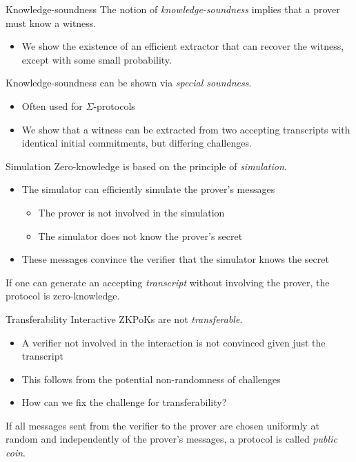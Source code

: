 \begin{frame}{Knowledge-soundness}
  The notion of \emph{knowledge-soundness} implies that a prover must know a witness.
  \begin{itemize}[<+(1)->]
    \item We show the existence of an efficient extractor that can recover the witness, except with some small probability.
  \end{itemize}

  \vspace*{1em}

  \pause
  Knowledge-soundness can be shown via \emph{special soundness}.
  \begin{itemize}[<+(1)->]
    \item Often used for $\Sigma$-protocols
    \item We show that a witness can be extracted from two accepting transcripts with identical initial commitments, but differing challenges.
  \end{itemize}
\end{frame}

\begin{frame}{Simulation}
  Zero-knowledge is based on the principle of \emph{simulation}.
  \begin{itemize}[<+(1)->]
    \item The simulator can efficiently simulate the prover's messages
    \begin{itemize}
      \item The prover is not involved in the simulation
      \item The simulator does not know the prover's secret
    \end{itemize}
    \item These messages convince the verifier that the simulator knows the secret
  \end{itemize}

  \vspace*{1em}

  \pause
  If one can generate an accepting \emph{transcript} without involving the prover, the protocol is zero-knowledge.
\end{frame}

\begin{frame}{Transferability}
  Interactive ZKPoKs are not \emph{transferable}.
  \begin{itemize}[<+(1)->]
    \item A verifier not involved in the interaction is not convinced given just the transcript
    \item This follows from the potential non-randomness of challenges
    \item How can we fix the challenge for transferability?
  \end{itemize}

  \vspace*{1em}

  \pause
  If all messages sent from the verifier to the prover are chosen uniformly at random and independently of the prover's messages, a protocol is called \emph{public coin}.
\end{frame}

